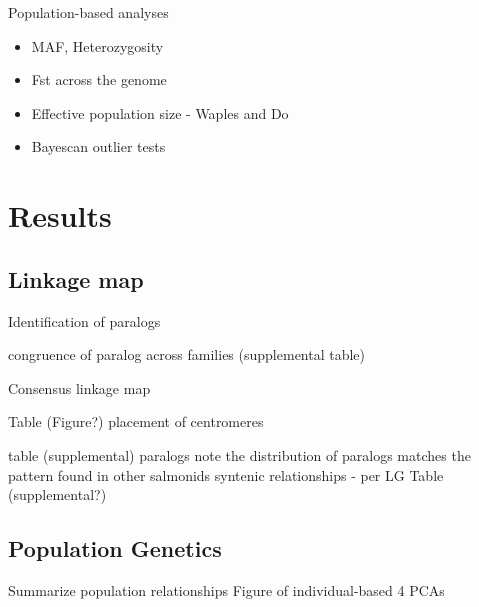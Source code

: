 \documentclass[12pt,  one column]{article}
\begin{document}
Population-based analyses
\begin{itemize}
	\item MAF, Heterozygosity
	\item Fst across the genome
    \item Effective population size - Waples and Do
    \item Bayescan outlier tests
\end{itemize}

\section*{Results}

\subsection*{Linkage map}
Identification of paralogs

congruence of paralog across families (supplemental table)

Consensus linkage map

Table (Figure?)
placement of centromeres

table (supplemental)
paralogs
note the distribution of paralogs matches the  pattern found in other salmonids
syntenic relationships - per LG
Table (supplemental?)


\subsection*{Population Genetics}

Summarize population relationships
Figure of individual-based 4 PCAs
\end{document}
